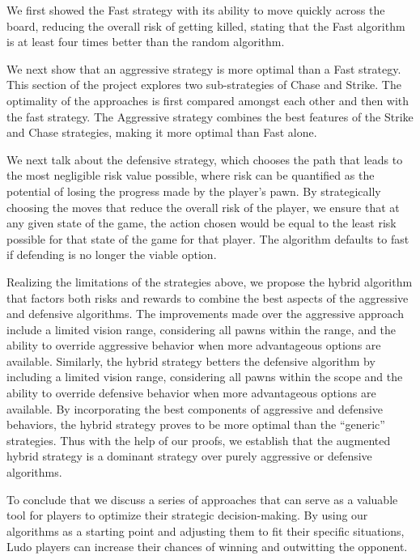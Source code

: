 \documentclass{article} %
\begin{document}
We first showed the Fast strategy with its ability to move quickly across the board, reducing the overall risk of getting killed, stating that the Fast algorithm is at least four times better than the random algorithm. 

We next show that an aggressive strategy is more optimal than a Fast strategy. This section of the project explores two sub-strategies of Chase and Strike. The optimality of the approaches is first compared amongst each other and then with the fast strategy. The Aggressive strategy combines the best features of the Strike and Chase strategies, making it more optimal than Fast alone. 

We next talk about the defensive strategy, which chooses the path that leads to the most negligible risk value possible, where risk can be quantified as the potential of losing the progress made by the player's pawn. By strategically choosing the moves that reduce the overall risk of the player, we ensure that at any given state of the game, the action chosen would be equal to the least risk possible for that state of the game for that player. The algorithm defaults to fast if defending is no longer the viable option.

Realizing the limitations of the strategies above, we propose the hybrid algorithm that factors both risks and rewards to combine the best aspects of the aggressive and defensive algorithms. The improvements made over the aggressive approach include a limited vision range, considering all pawns within the range, and the ability to override aggressive behavior when more advantageous options are available. Similarly, the hybrid strategy betters the defensive algorithm by including a limited vision range, considering all pawns within the scope and the ability to override defensive behavior when more advantageous options are available. By incorporating the best components of aggressive and defensive behaviors, the hybrid strategy proves to be more optimal than the “generic” strategies. Thus with the help of our proofs, we establish that the augmented hybrid strategy is a dominant strategy over purely aggressive or defensive algorithms.

To conclude that we discuss a series of approaches that can serve as a valuable tool for players to optimize their strategic decision-making. By using our algorithms as a starting point and adjusting them to fit their specific situations, Ludo players can increase their chances of winning and outwitting  the opponent.
\end{document}
